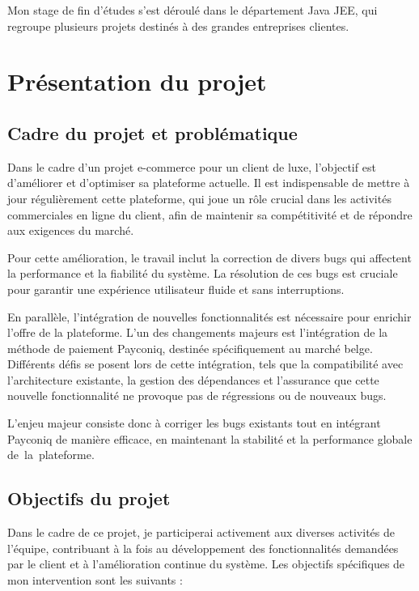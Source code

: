 Mon stage de fin d'études s'est déroulé dans le département Java JEE, qui regroupe plusieurs projets destinés à des grandes entreprises clientes.


\section{Présentation du projet}

\subsection{Cadre du projet et problématique}

Dans le cadre d'un projet e-commerce pour un client de luxe, l'objectif est d'améliorer et d'optimiser sa plateforme actuelle. Il est indispensable de mettre à jour régulièrement cette plateforme, qui joue un rôle crucial dans les activités commerciales en ligne du client, afin de maintenir sa compétitivité et de répondre aux exigences du marché.

Pour cette amélioration, le travail inclut la correction de divers bugs qui affectent la performance et la fiabilité du système. La résolution de ces bugs est cruciale pour garantir une expérience utilisateur fluide et sans interruptions.

En parallèle, l'intégration de nouvelles fonctionnalités est nécessaire pour enrichir l'offre de la plateforme. L'un des changements majeurs est l'intégration de la méthode de paiement Payconiq, destinée spécifiquement au marché belge. Différents défis se posent lors de cette intégration, tels que la compatibilité avec l'architecture existante, la gestion des dépendances et l'assurance que cette nouvelle fonctionnalité ne provoque pas de régressions ou de nouveaux bugs.

L'enjeu majeur consiste donc à corriger les bugs existants tout en intégrant Payconiq de manière efficace, en maintenant la stabilité et la performance globale de la plateforme.

 \subsection{Objectifs du projet}

 Dans le cadre de ce projet, je participerai activement aux diverses activités de l'équipe, contribuant à la fois au développement des fonctionnalités demandées par le client et à l'amélioration continue du système. Les objectifs spécifiques de mon intervention sont les suivants :

